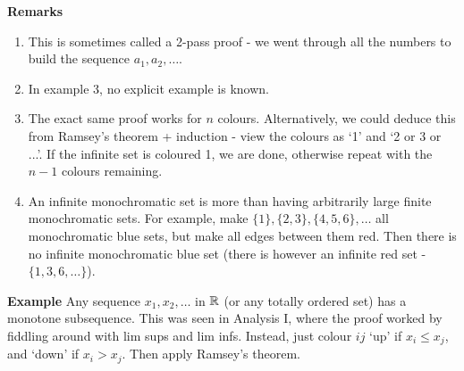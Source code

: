 \documentclass[10pt,a4paper]{article}
\begin{document}
\textbf{Remarks}
\begin{enumerate}
  \item This is sometimes called a 2-pass proof - we went through all the numbers to build the sequence $a_1, a_2, \ldots$.
  \item In example 3, no explicit example is known.
  \item The exact same proof works for $n$ colours. Alternatively, we could deduce this from Ramsey's theorem + induction - view the colours as `1' and `2 or 3 or ...'. If the infinite set is coloured 1, we are done, otherwise repeat with the $n-1$ colours remaining.
  \item An infinite monochromatic set is more than having arbitrarily large finite monochromatic sets. For example, make $\{1\}, \{2,3\}, \{4,5,6\}, \ldots$ all monochromatic blue sets, but make all edges between them red. Then there is no infinite monochromatic blue set (there is however an infinite red set - $\{1,3,6,\ldots\}$).
\end{enumerate}

\textbf{Example}
Any sequence $x_1, x_2, \ldots$ in $\mathbb{R}$ (or any totally ordered set) has a monotone subsequence. This was seen in Analysis I, where the proof worked by fiddling around with lim sups and lim infs. Instead, just colour $ij$ `up' if $x_i \leq x_j$, and `down' if $x_i>x_j$. Then apply Ramsey's theorem.
\end{document}
